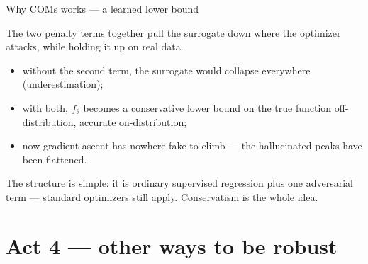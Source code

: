 \documentclass[10pt, aspectratio=169]{beamer}
\begin{document}
\begin{frame}{Why COMs works --- a learned lower bound}
\begin{center}\large
The two penalty terms together pull the surrogate \alert{down where the optimizer attacks}, while \alert{holding it up on real data}.
\end{center}
\medskip
\begin{itemize}\setlength\itemsep{2pt}
\item without the second term, the surrogate would collapse everywhere (underestimation);
\item with both, $f_\theta$ becomes a \alert{conservative lower bound} on the true function off-distribution, accurate on-distribution;
\item now gradient ascent has nowhere fake to climb --- the hallucinated peaks have been flattened.
\end{itemize}
\medskip

\pause
\begin{center}
\end{center}
\medskip
\pause
The structure is simple: it is ordinary supervised regression plus one adversarial term --- standard optimizers still apply. Conservatism is the whole idea.
\end{frame}

\section{Act 4 --- other ways to be robust}
\end{document}
